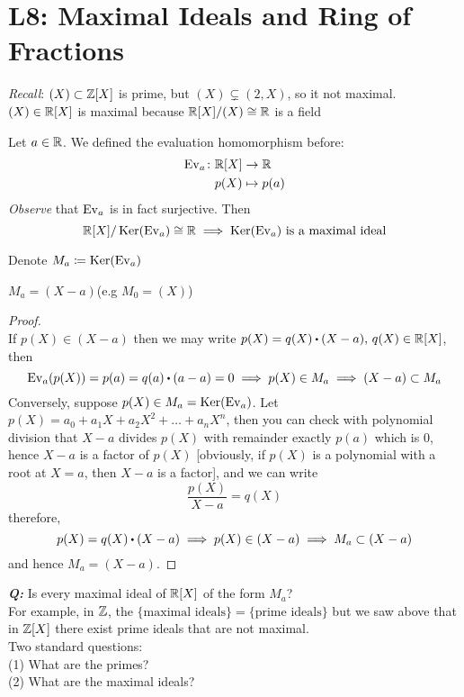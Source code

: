 \documentclass[../Main.tex]{subfiles}
\begin{document}
\chapter{L8: Maximal Ideals and Ring of Fractions}

\textit{Recall}: $(X) \subset \mathbb{Z}[X]$ is prime, but $(X)\subsetneq (2,X)$, so it not maximal.\\
$(X)\in \mathbb{R}[X]$ is maximal because $\mathbb{R}[X]/(X) \cong \mathbb{R}$ is a field

\begin{example}
	Let $a\in \mathbb{R}$. We defined the evaluation homomorphism before:
	\begin{align*}
	\operatorname{Ev}_a\colon \mathbb{R}[X] &\to \mathbb{R} \\
	p(X) &\mapsto p(a)
	\end{align*}
	\textit{Observe} that $\operatorname{Ev}_a$ is in fact surjective. Then
	\[\mathbb{R}[X]/\operatorname{Ker}(\operatorname{Ev}_a) \cong \mathbb{R} \implies \operatorname{Ker}(\operatorname{Ev}_a) \text{ is a maximal ideal}\]
\end{example}
	Denote $M_a\coloneqq \operatorname{Ker}(\operatorname{Ev}_a)$
	\begin{claim}
		$M_a = (X-a)$\quad (e.g $M_0 =(X)$)
	\end{claim}
	\begin{proof}~\\
		If $p(X) \in (X-a)$ then we may write $p(X)=q(X)\rdot (X-a),\, q(X)\in \R[X]$, then
		\[\ev_a(p(X)) = p(a) = q(a)\rdot (a-a)=0 \implies p(X)\in M_a \implies (X-a) \subset M_a\] 
		Conversely, suppose $p(X) \in M_a = \operatorname{Ker}(\operatorname{Ev}_a)$. Let $p(X) = a_0 + a_1X+a_2X^2+\dots+a_nX^n$, then you can check with polynomial division that $X-a$ divides $p(X)$ with remainder exactly $p(a)$ which is $0$, hence $X-a$ is a factor of $p(X)$ [obviously, if $p(X)$ is a polynomial with a root at $X=a$, then $X-a$ is a factor], and we can write
		\[\frac{p(X)}{X-a} = q(X)\]
		therefore,
		\[p(X)=q(X)\rdot (X-a)\implies p(X) \in (X-a) \implies M_a \subset (X-a) \]
		and hence $M_a =(X-a)$.
	\end{proof}
\textbf{\textit{Q:}} Is every maximal ideal of $\mathbb{R}[X]$ of the form $M_a$?\\
For example, in $\mathbb{Z}$, the $\{\text{maximal ideals}\} =\{\text{prime ideals}\}$ but we saw above that in $\mathbb{Z}[X]$ there exist prime ideals that are not maximal.\\
Two standard questions:\\
(1) What are the primes?\\
(2) What are the maximal ideals?
\end{document}
